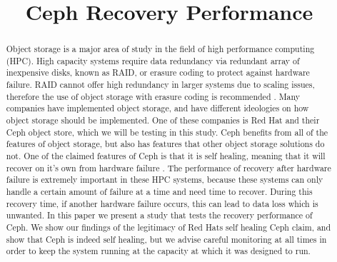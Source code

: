 \documentclass[conference,compsoc]{IEEEtran}
\begin{document}
\title{Ceph Recovery Performance}


\author{
\and
{}
}

\maketitle


\begin{abstract}
Object storage is a major area of study in the field of high performance computing (HPC). High capacity systems require data redundancy via redundant array of inexpensive disks, known as RAID, or erasure coding to protect against hardware failure. RAID cannot offer high redundancy in larger systems due to scaling issues, therefore the use of object storage with erasure coding is recommended \cite{wang_evaluation}. Many companies have implemented object storage, and have different ideologies on how object storage should be implemented. One of these companies is Red Hat and their Ceph object store, which we will be testing in this study. Ceph benefits from all of the features of object storage, but also has features that other object storage solutions do not. One of the claimed features of Ceph is that it is self healing, meaning that it will recover on it’s own from hardware failure \cite{self_healing_claim}. The performance of recovery after hardware failure is extremely important in these HPC systems, because these systems can only handle a certain amount of failure at a time and need time to recover. During this recovery time, if another hardware failure occurs, this can lead to data loss which is unwanted. In this paper we present a study that tests the recovery performance of Ceph. We show our findings of the legitimacy of Red Hat\textquotesingle s self healing Ceph claim, and show that Ceph is indeed self healing, but we advise careful monitoring at all times in order to keep the system running at the capacity at which it was designed to run.  
\end{abstract}
\end{document}

